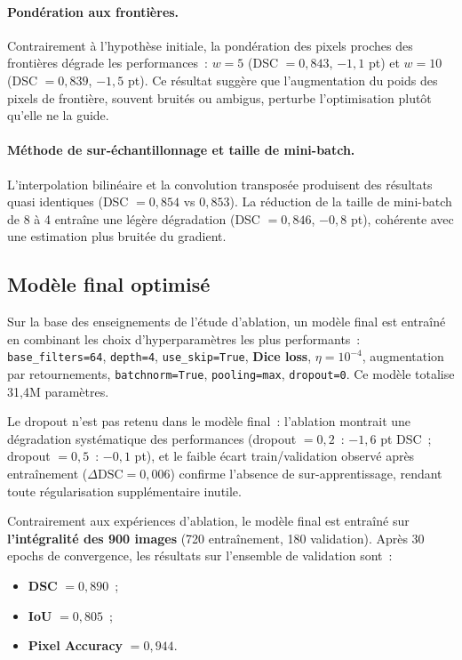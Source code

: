 \documentclass[12pt,a4paper]{article}
\begin{document}
\paragraph{Pondération aux frontières.} Contrairement à l'hypothèse initiale, la pondération des pixels proches des frontières dégrade les performances~: $w = 5$ (DSC $= 0{,}843$, $-1{,}1$ pt) et $w = 10$ (DSC $= 0{,}839$, $-1{,}5$ pt). Ce résultat suggère que l'augmentation du poids des pixels de frontière, souvent bruités ou ambigus, perturbe l'optimisation plutôt qu'elle ne la guide.

\paragraph{Méthode de sur-échantillonnage et taille de mini-batch.} L'interpolation bilinéaire et la convolution transposée produisent des résultats quasi identiques (DSC $= 0{,}854$ vs $0{,}853$). La réduction de la taille de mini-batch de 8 à 4 entraîne une légère dégradation (DSC $= 0{,}846$, $-0{,}8$ pt), cohérente avec une estimation plus bruitée du gradient.

\subsection{Modèle final optimisé}
\label{subsec:final_model}

Sur la base des enseignements de l'étude d'ablation, un modèle final est entraîné en combinant les choix d'hyperparamètres les plus performants~: \texttt{base\_filters=64}, \texttt{depth=4}, \texttt{use\_skip=True}, \textbf{Dice loss}, $\eta = 10^{-4}$, augmentation par retournements, \texttt{batchnorm=True}, \texttt{pooling=max}, \texttt{dropout=0}. Ce modèle totalise 31,4M paramètres.

Le dropout n'est pas retenu dans le modèle final~: l'ablation montrait une dégradation systématique des performances (dropout $= 0{,}2$~: $-1{,}6$ pt DSC~; dropout $= 0{,}5$~: $-0{,}1$ pt), et le faible écart train/validation observé après entraînement ($\Delta \text{DSC} = 0{,}006$) confirme l'absence de sur-apprentissage, rendant toute régularisation supplémentaire inutile.

Contrairement aux expériences d'ablation, le modèle final est entraîné sur \textbf{l'intégralité des 900 images} (720 entraînement, 180 validation). Après 30 epochs de convergence, les résultats sur l'ensemble de validation sont~:
\begin{itemize}[nosep]
    \item \textbf{DSC} $= 0{,}890$~;
    \item \textbf{IoU} $= 0{,}805$~;
    \item \textbf{Pixel Accuracy} $= 0{,}944$.
\end{itemize}
\end{document}
